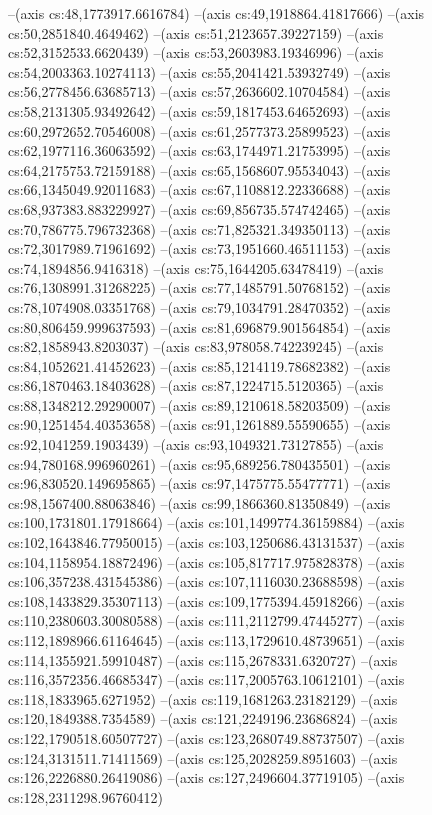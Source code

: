 --(axis cs:48,1773917.6616784)
--(axis cs:49,1918864.41817666)
--(axis cs:50,2851840.4649462)
--(axis cs:51,2123657.39227159)
--(axis cs:52,3152533.6620439)
--(axis cs:53,2603983.19346996)
--(axis cs:54,2003363.10274113)
--(axis cs:55,2041421.53932749)
--(axis cs:56,2778456.63685713)
--(axis cs:57,2636602.10704584)
--(axis cs:58,2131305.93492642)
--(axis cs:59,1817453.64652693)
--(axis cs:60,2972652.70546008)
--(axis cs:61,2577373.25899523)
--(axis cs:62,1977116.36063592)
--(axis cs:63,1744971.21753995)
--(axis cs:64,2175753.72159188)
--(axis cs:65,1568607.95534043)
--(axis cs:66,1345049.92011683)
--(axis cs:67,1108812.22336688)
--(axis cs:68,937383.883229927)
--(axis cs:69,856735.574742465)
--(axis cs:70,786775.796732368)
--(axis cs:71,825321.349350113)
--(axis cs:72,3017989.71961692)
--(axis cs:73,1951660.46511153)
--(axis cs:74,1894856.9416318)
--(axis cs:75,1644205.63478419)
--(axis cs:76,1308991.31268225)
--(axis cs:77,1485791.50768152)
--(axis cs:78,1074908.03351768)
--(axis cs:79,1034791.28470352)
--(axis cs:80,806459.999637593)
--(axis cs:81,696879.901564854)
--(axis cs:82,1858943.8203037)
--(axis cs:83,978058.742239245)
--(axis cs:84,1052621.41452623)
--(axis cs:85,1214119.78682382)
--(axis cs:86,1870463.18403628)
--(axis cs:87,1224715.5120365)
--(axis cs:88,1348212.29290007)
--(axis cs:89,1210618.58203509)
--(axis cs:90,1251454.40353658)
--(axis cs:91,1261889.55590655)
--(axis cs:92,1041259.1903439)
--(axis cs:93,1049321.73127855)
--(axis cs:94,780168.996960261)
--(axis cs:95,689256.780435501)
--(axis cs:96,830520.149695865)
--(axis cs:97,1475775.55477771)
--(axis cs:98,1567400.88063846)
--(axis cs:99,1866360.81350849)
--(axis cs:100,1731801.17918664)
--(axis cs:101,1499774.36159884)
--(axis cs:102,1643846.77950015)
--(axis cs:103,1250686.43131537)
--(axis cs:104,1158954.18872496)
--(axis cs:105,817717.975828378)
--(axis cs:106,357238.431545386)
--(axis cs:107,1116030.23688598)
--(axis cs:108,1433829.35307113)
--(axis cs:109,1775394.45918266)
--(axis cs:110,2380603.30080588)
--(axis cs:111,2112799.47445277)
--(axis cs:112,1898966.61164645)
--(axis cs:113,1729610.48739651)
--(axis cs:114,1355921.59910487)
--(axis cs:115,2678331.6320727)
--(axis cs:116,3572356.46685347)
--(axis cs:117,2005763.10612101)
--(axis cs:118,1833965.6271952)
--(axis cs:119,1681263.23182129)
--(axis cs:120,1849388.7354589)
--(axis cs:121,2249196.23686824)
--(axis cs:122,1790518.60507727)
--(axis cs:123,2680749.88737507)
--(axis cs:124,3131511.71411569)
--(axis cs:125,2028259.8951603)
--(axis cs:126,2226880.26419086)
--(axis cs:127,2496604.37719105)
--(axis cs:128,2311298.96760412)
